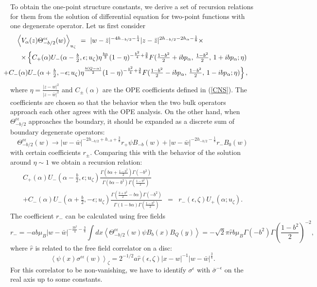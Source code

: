 \documentclass[a4paper,12pt]{article}
\newcommand{\vev}[1]{\left<{#1}\right>}
\newcommand{\tfrac}[2]{{\textstyle\frac{#1}{#2}}}
\newcommand{\ep}{{\epsilon}}
\begin{document}
   To obtain the one-point structure constants, we derive
 a set of recursion relations for them from the solution
 of differential equation for two-point functions with
 one degenerate operator.
 Let us first consider
\begin{eqnarray}
\lefteqn{
  \vev{V_\alpha(z)\Theta_{-b/2}^{\ep\ep}(w)}_{u_\zeta}
~=~|w-\bar{z}|^{-4h_{-b/2}-\frac{1}{4}}
   |z-\bar{z}|^{2h_{-b/2}-2h_\alpha-\frac{1}{8}}\times }
 \nonumber \\ && \hskip-6mm
 \times\left\{
   C_+(\alpha)U_-(\alpha-\tfrac{b}{2},\ep;u_\zeta)
   \eta^{\frac{b\alpha}{2}}(1-\eta)^{-\frac{b^2}{4}+\frac{3}{8}}
   F(\tfrac{1-b^2}{2}+ibp_\alpha,\,\tfrac{1-b^2}{2},\,1+ibp_\alpha;\eta)
        \right. \nonumber \\ && \left. \hskip-11mm
  +C_-(\alpha)U_-(\alpha+\tfrac{b}{2},-\ep;u_\zeta)
   \eta^{\frac{b(Q-\alpha)}{2}}(1-\eta)^{-\frac{b^2}{4}+\frac{3}{8}}
   F(\tfrac{1-b^2}{2}-ibp_\alpha,\,\tfrac{1-b^2}{2},\,1-ibp_\alpha;\eta)
   \right\},
\end{eqnarray}
 where $\eta=\frac{|z-w|^2}{|z-\bar{w}|^2}$ and $C_\pm(\alpha)$
 are the OPE coefficients defined in (\ref{CNS}).
 The coefficients are chosen so that the behavior
 when the two bulk operators approach each other
 agrees with the OPE analysis.
 On the other hand, when $\Theta_{-b/2}^{\ep\ep}$ approaches the
 boundary, it should be expanded as a discrete sum of boundary
 degenerate operators:
\begin{equation}
  \Theta_{-b/2}^{\ep\ep}(w)\rightarrow
  |w-\bar{w}|^{-2h_{-b/2}+h_{-b}+\frac{3}{8}}r_+\psi B_{-b}(w)
 +|w-\bar{w}|^{-2h_{-b/2}-\frac{1}{8}}r_-B_0(w)
\end{equation}
 with certain coefficients $r_\pm$.
 Comparing this with the behavior of the solution around $\eta\sim1$
 we obtain a recursion relation:
\begin{eqnarray}
   C_+(\alpha)U_-(\alpha-\tfrac{b}{2},\ep;u_\zeta)
  \frac{\Gamma(b\alpha+\frac{1-b^2}{2})\Gamma(-b^2)}
       {\Gamma(b\alpha-b^2)\Gamma(\frac{1-b^2}{2})}
 ~~~~
 \nonumber \\
  +C_-(\alpha)U_-(\alpha+\tfrac{b}{2},-\ep;u_\zeta)
  \frac{\Gamma(\frac{3+b^2}{2}-b\alpha)\Gamma(-b^2)}
       {\Gamma(1-b\alpha)\Gamma(\frac{1-b^2}{2})}
 &=& r_-(\ep,\zeta)U_+(\alpha;u_\zeta).
\label{rcU1}
\end{eqnarray}
 The coefficient $r_-$ can be calculated using free fields
\begin{equation}
  r_- = -ab\mu_B|w-\bar{w}|^{-\frac{3b^2}{4}-\frac{3}{8}}
        \int dx\vev{\Theta_{-b/2}^{\ep\ep}(w)\psi B_b(x)B_Q(y)}
      =-\sqrt{2}\pi\hat{r} b\mu_B\Gamma(-b^2)\Gamma(\tfrac{1-b^2}{2})^{-2},
\end{equation}
 where $\hat{r}$ is related to the free field correlator on a disc:
\begin{equation}
  \vev{\psi(x)\sigma^{\ep\ep}(w)}_\zeta
 =2^{-1/2}a\hat{r}(\ep,\zeta)|x-w|^{-1}|w-\bar{w}|^{\frac{3}{8}}.
\end{equation}
 For this correlator to be non-vanishing, we have to identify
 $\sigma^\ep$ with $\bar{\sigma}^{-\ep}$ on the real axis
 up to some constants.
\end{document}
